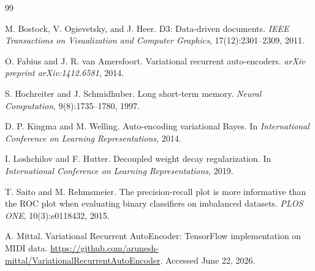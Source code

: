 \documentclass[11pt]{article}
\begin{document}
\begin{thebibliography}{99}

M. Bostock, V. Ogievetsky, and J. Heer.
D3: Data-driven documents.
\emph{IEEE Transactions on Visualization and Computer Graphics}, 17(12):2301--2309, 2011.

O. Fabius and J. R. van Amersfoort.
Variational recurrent auto-encoders.
\emph{arXiv preprint arXiv:1412.6581}, 2014.

S. Hochreiter and J. Schmidhuber.
Long short-term memory.
\emph{Neural Computation}, 9(8):1735--1780, 1997.

D. P. Kingma and M. Welling.
Auto-encoding variational Bayes.
In \emph{International Conference on Learning Representations}, 2014.

I. Loshchilov and F. Hutter.
Decoupled weight decay regularization.
In \emph{International Conference on Learning Representations}, 2019.

T. Saito and M. Rehmsmeier.
The precision-recall plot is more informative than the ROC plot when evaluating binary classifiers on imbalanced datasets.
\emph{PLOS ONE}, 10(3):e0118432, 2015.

A. Mittal.
Variational Recurrent AutoEncoder: TensorFlow implementation on MIDI data.
\url{https://github.com/arunesh-mittal/VariationalRecurrentAutoEncoder}.
Accessed June 22, 2026.

\end{thebibliography}
\end{document}
